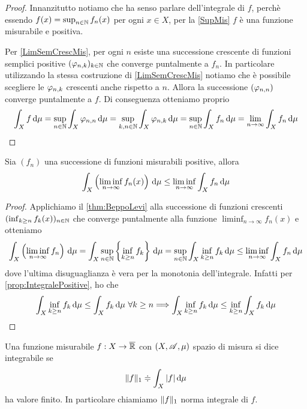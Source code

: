 \begin{proof}
	Innanzitutto notiamo che ha senso parlare dell'integrale di $f$, perchè essendo $f(x)=\sup_{n\in\mathbb N}f_n(x)$ per ogni $x\in X$, per la \cref{SupMis} $f$ è una funzione misurabile e positiva.
	
	Per \cref{LimSemCrescMis}, per ogni $n$ esiste una successione crescente di funzioni semplici positive $(\varphi_{n,k})_{k\in\mathbb N}$ che converge puntalmente a $f_n$. In particolare utilizzando la stessa costruzione di \cref{LimSemCrescMis} notiamo che è possibile scegliere le $\varphi_{n,k}$ crescenti anche rispetto a $n$. Allora la successione $(\varphi_{n,n})$ converge puntalmente a $f$. Di conseguenza otteniamo proprio
	\begin{equation*}
		\int_X f\,\mathrm d\mu=\sup_{n\in\mathbb N}\int_X\varphi_{n,n}\,\mathrm d\mu=\sup_{k,n\in\mathbb N}\int_X \varphi_{n,k}\,\mathrm d\mu=\sup_{n\in\mathbb N}\int_X f_n\,\mathrm d\mu=\lim_{n\to\infty}\int_Xf_n\,\mathrm d\mu
	\end{equation*}
\end{proof}


\begin{lemma}[Fatou] \label{lem:Fatou}
	Sia $(f_n)$ una successione di funzioni misurabili positive, allora 
	\begin{equation*}
		\int_X\left(\liminf_{n\to\infty}f_n(x)\right)\,\mathrm d\mu\le \liminf_{n\to\infty}\int_Xf_n\,\mathrm d\mu
	\end{equation*}
\end{lemma}

\begin{proof}
	Applichiamo il \cref{thm:BeppoLevi} alla successione di funzioni crescenti $(\inf_{k\ge n}f_k(x))_{n\in\mathbb N}$ che converge puntalmente alla funzione $\liminf_{n\to\infty}f_n(x)$ e otteniamo
	\begin{equation*}
		\int_X\left(\liminf_{n\to\infty}f_n\right)\,\mathrm d\mu=\int_X \sup_{n\in\mathbb N}\left\{\inf_{k\ge n}f_k\right\}\,\mathrm d\mu=\sup_{n\in\mathbb N}\int_X \inf_{k\ge n}f_k\,\mathrm d\mu\le \liminf_{n\to\infty}\int_Xf_n\,\mathrm d\mu
	\end{equation*}
	dove l'ultima disuguaglianza è vera per la monotonia dell'integrale. Infatti per \cref{prop:IntegralePositive}, ho che
	\begin{equation*}
		\int_X \inf_{k\ge n}f_k\,\mathrm d\mu\le \int_Xf_k\,\mathrm d\mu \ \forall k\ge n \Longrightarrow \int_X \inf_{k\ge n}f_k\,\mathrm d\mu\le \inf_{k\ge n}\int_Xf_k\,\mathrm d\mu
	\end{equation*}
\end{proof}

\begin{definition}
	Una funzione misurabile $f:X\to\overline{\mathbb R}$ con $(X,\mathscr A,\mu)$ spazio di misura si dice integrabile se 
	\begin{equation*}
		\Vert f\Vert_1\doteqdot \int_X |f|\,\mathrm d\mu
	\end{equation*}
	ha valore finito. In particolare chiamiamo $\Vert f\Vert_1$ norma integrale di $f$.
	
\end{definition}

